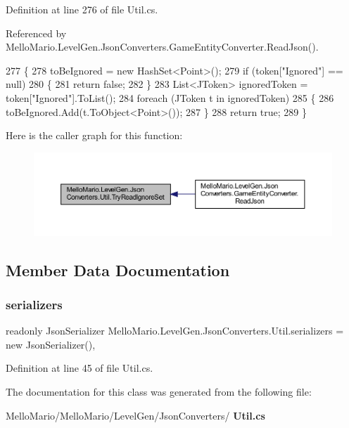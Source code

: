 Definition at line 276 of file Util.\+cs.



Referenced by Mello\+Mario.\+Level\+Gen.\+Json\+Converters.\+Game\+Entity\+Converter.\+Read\+Json().


\begin{DoxyCode}
277         \{
278             toBeIgnored = \textcolor{keyword}{new} HashSet<Point>();
279             \textcolor{keywordflow}{if} (token[\textcolor{stringliteral}{"Ignored"}] == null)
280             \{
281                 \textcolor{keywordflow}{return} \textcolor{keyword}{false};
282             \}
283             List<JToken> ignoredToken = token[\textcolor{stringliteral}{"Ignored"}].ToList();
284             \textcolor{keywordflow}{foreach} (JToken t \textcolor{keywordflow}{in} ignoredToken)
285             \{
286                 toBeIgnored.Add(t.ToObject<Point>());
287             \}
288             \textcolor{keywordflow}{return} \textcolor{keyword}{true};
289         \}
\end{DoxyCode}
Here is the caller graph for this function\+:
\nopagebreak
\begin{figure}[H]
\begin{center}
\leavevmode
\includegraphics[width=350pt]{classMelloMario_1_1LevelGen_1_1JsonConverters_1_1Util_a16c66ecc8d088a86c95326ff50dcd373_icgraph}
\end{center}
\end{figure}


\subsection{Member Data Documentation}
\mbox{\label{classMelloMario_1_1LevelGen_1_1JsonConverters_1_1Util_a8f00dced1b516c61ecf059d7eeeda46f}} 
\subsubsection{serializers}
{\footnotesize\ttfamily readonly Json\+Serializer Mello\+Mario.\+Level\+Gen.\+Json\+Converters.\+Util.\+serializers = new Json\+Serializer()\hspace{0.3cm}{\ttfamily [static]}, {\ttfamily [private]}}



Definition at line 45 of file Util.\+cs.



The documentation for this class was generated from the following file\+:\begin{DoxyCompactItemize}
\item 
Mello\+Mario/\+Mello\+Mario/\+Level\+Gen/\+Json\+Converters/\textbf{ Util.\+cs}\end{DoxyCompactItemize}

